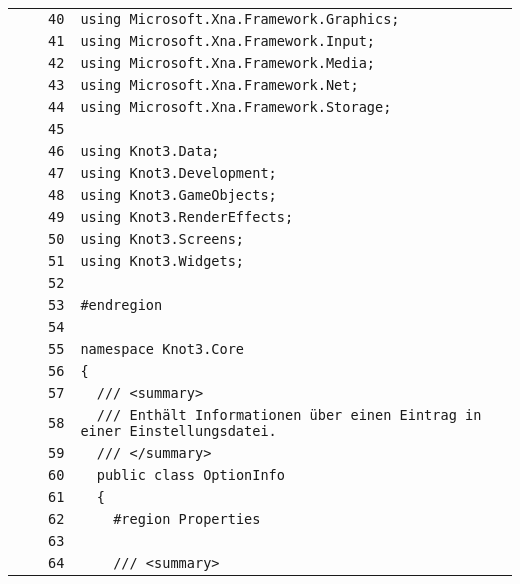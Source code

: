 \documentclass[a4paper,10pt]{article}
\begin{document}
\begin{longtable}[l]{lrrl}
\cellcolor{gray} &  & \verb~40~ & \verb~using Microsoft.Xna.Framework.Graphics;~\\
\cellcolor{gray} &  & \verb~41~ & \verb~using Microsoft.Xna.Framework.Input;~\\
\cellcolor{gray} &  & \verb~42~ & \verb~using Microsoft.Xna.Framework.Media;~\\
\cellcolor{gray} &  & \verb~43~ & \verb~using Microsoft.Xna.Framework.Net;~\\
\cellcolor{gray} &  & \verb~44~ & \verb~using Microsoft.Xna.Framework.Storage;~\\
\cellcolor{gray} &  & \verb~45~ & \verb~~\\
\cellcolor{gray} &  & \verb~46~ & \verb~using Knot3.Data;~\\
\cellcolor{gray} &  & \verb~47~ & \verb~using Knot3.Development;~\\
\cellcolor{gray} &  & \verb~48~ & \verb~using Knot3.GameObjects;~\\
\cellcolor{gray} &  & \verb~49~ & \verb~using Knot3.RenderEffects;~\\
\cellcolor{gray} &  & \verb~50~ & \verb~using Knot3.Screens;~\\
\cellcolor{gray} &  & \verb~51~ & \verb~using Knot3.Widgets;~\\
\cellcolor{gray} &  & \verb~52~ & \verb~~\\
\cellcolor{gray} &  & \verb~53~ & \verb~#endregion~\\
\cellcolor{gray} &  & \verb~54~ & \verb~~\\
\cellcolor{gray} &  & \verb~55~ & \verb~namespace Knot3.Core~\\
\cellcolor{gray} &  & \verb~56~ & \verb~{~\\
\cellcolor{gray} &  & \verb~57~ & \verb~  /// <summary>~\\
\cellcolor{gray} &  & \verb~58~ & \verb~  /// Enthält Informationen über einen Eintrag in einer Einstellungsdatei.~\\
\cellcolor{gray} &  & \verb~59~ & \verb~  /// </summary>~\\
\cellcolor{gray} &  & \verb~60~ & \verb~  public class OptionInfo~\\
\cellcolor{gray} &  & \verb~61~ & \verb~  {~\\
\cellcolor{gray} &  & \verb~62~ & \verb~    #region Properties~\\
\cellcolor{gray} &  & \verb~63~ & \verb~~\\
\cellcolor{gray} &  & \verb~64~ & \verb~    /// <summary>~\\

\end{longtable}
\end{document}
